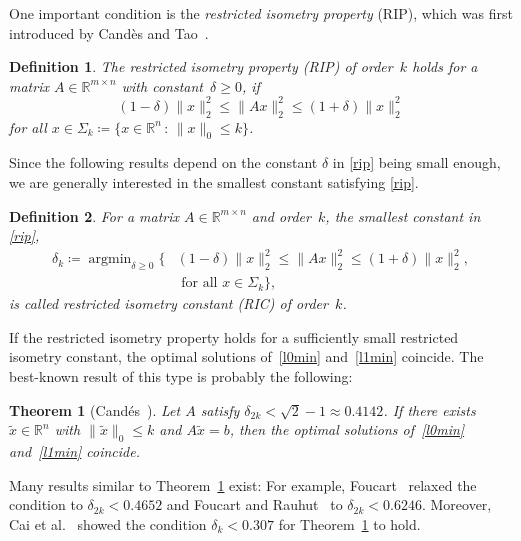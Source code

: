 \documentclass[journal]{IEEEtran}
\newtheorem{theorem}{Theorem}
\newtheorem{definition}{Definition}
\DeclareMathOperator*{\argmin}{argmin}
\newcommand{\suchthat}{\,:\,}
\newcommand{\define}{\coloneqq}
\newcommand{\Norm}[2]{\lVert{#1}\rVert_{#2}}
\newcommand{\R}{\mathds{R}}
\begin{document}
One important condition is the \emph{restricted isometry property} (RIP),
which was first introduced by Cand\`es and Tao~\cite{CT05}. 

\begin{definition}\label{ripdef}
  The \emph{restricted isometry property} (RIP) of order~$k$ holds for a
  matrix $A \in \R^{m \times n}$ with constant~$\delta \geq 0$, if
  \begin{equation}\label{rip}
    (1 - \delta) \Norm{x}{2}^2 \leq \Norm{Ax}{2}^2 \leq (1+\delta) \Norm{x}{2}^2
  \end{equation}
  for all $x \in \Sigma_k \define \{x \in \R^n \suchthat \Norm{x}{0} \leq k\}$.
\end{definition}

Since the following results depend on the constant $\delta$ in \eqref{rip} being
small enough, we are generally interested in the smallest constant satisfying
\eqref{rip}.

\begin{definition}\label{ricdef}
  For a matrix $A \in \R^{m \times n}$ and order~$k$, the smallest constant in 
  \eqref{rip},
  \begin{equation}\label{ric}
    \begin{aligned}
      \delta_k \define \argmin_{\delta \geq 0} \big\{&(1 - \delta) \Norm{x}{2}^2 \leq \Norm{Ax}{2}^2 \leq (1+\delta) \Norm{x}{2}^2 ,\\
      & \text{ for all }x \in \Sigma_k \big\},
    \end{aligned}
  \end{equation}
  is called \emph{restricted isometry constant} (RIC) of order~$k$.
\end{definition}

If the restricted isometry property holds for a sufficiently small
restricted isometry constant, the optimal solutions of~\eqref{l0min}
and~\eqref{l1min} coincide.  The best-known result of this type is probably
the following:
 
\begin{theorem}[Cand\'es~\cite{Can08}]\label{RIPsqrt2}
  Let $A$ satisfy $\delta_{2k} < \sqrt{2}-1 \approx 0.4142$. If there
  exists $\tilde{x} \in \R^n$ with $\Norm{\tilde{x}}{0} \leq k$ and
  $A\tilde{x} = b$, then the optimal solutions of~\eqref{l0min}
  and~\eqref{l1min} coincide.
\end{theorem}

Many results similar to Theorem~\ref{RIPsqrt2} exist: For
example, Foucart~\cite{fou10} relaxed the condition to $\delta_{2k} <
0.4652$ and Foucart and Rauhut~\cite{FouR13} to $\delta_{2k} < 0.6246$.
Moreover, Cai et al.~\cite{CWX10} showed the condition $\delta_k <
0.307$ for Theorem~\ref{RIPsqrt2} to hold. 
\end{document}
